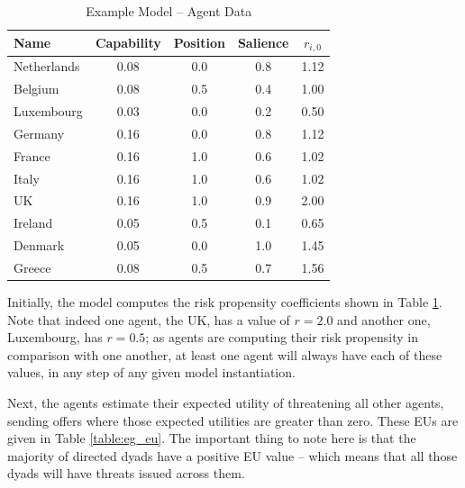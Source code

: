 \begin{table}
\centering
\caption{Example Model -- Agent Data}
\label{table:eg_agent_data}
\begin{tabular}{lccc|c}
    \hline
    Name &  Capability &  Position &  Salience & $r_{i,0}$ \\
    \hline
    Netherlands &        0.08 &       0.0 &       0.8 & 1.12 \\
        Belgium &        0.08 &       0.5 &       0.4 & 1.00 \\
     Luxembourg &        0.03 &       0.0 &       0.2 & 0.50 \\
        Germany &        0.16 &       0.0 &       0.8 & 1.12 \\
         France &        0.16 &       1.0 &       0.6 & 1.02 \\
          Italy &        0.16 &       1.0 &       0.6 & 1.02 \\
             UK &        0.16 &       1.0 &       0.9 & 2.00 \\
        Ireland &        0.05 &       0.5 &       0.1 & 0.65 \\
        Denmark &        0.05 &       0.0 &       1.0 & 1.45 \\
         Greece &        0.08 &       0.5 &       0.7 & 1.56 \\
    \hline
\end{tabular}
\tableSpace
\end{table}

Initially, the model computes the risk propensity coefficients shown in Table \ref{table:eg_agent_data}. Note that indeed one agent, the UK, has a value of $r=2.0$ and another one, Luxembourg, has $r=0.5$; as agents are computing their risk propensity in comparison with one another, at least one agent will always have each of these values, in any step of any given model instantiation.

Next, the agents estimate their expected utility of threatening all other agents, sending offers where those expected utilities are greater than zero. These EUs are given in Table \ref{table:eg_eu}. The important thing to note here is that the majority of directed dyads have a positive EU value -- which means that all those dyads will have threats issued across them. 

